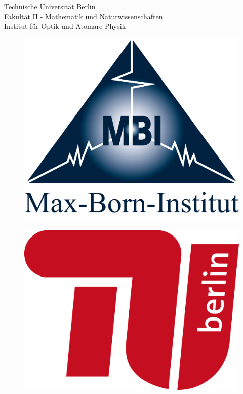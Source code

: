 \begin{titlepage}	
\noindent
\begin{minipage}{0.5\textwidth}
{\small
Technische Universit\"at Berlin\\
Fakult\"at II - Mathematik und Naturwissenschaften\\
Institut für Optik und Atomare Physik\\
}%
\end{minipage}%
\hfill
\begin{minipage}{0.18\textwidth}
\begin{figure}[H]%
\includegraphics[width=\textwidth]{images/logos/mbi/MBILogo_german_short_blue.png}
\end{figure}
\end{minipage}%
\hspace{5mm}
\begin{minipage}{0.18\textwidth}
\begin{figure}[H]%
\includegraphics[width=\textwidth]{images/logos/tu/TU_Logo_kurz_RGB_rot.png}
\end{figure}
\end{minipage}%


\end{titlepage}

